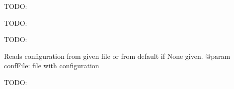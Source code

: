 \documentclass[a4paper,11pt,openany]{sphinxmanual}
\begin{document}
\begin{fulllineitems}
\begin{fulllineitems}
\end{fulllineitems}


\begin{fulllineitems}
\label{ref-manual/XrdTestSlave:XrdTestSlave.XrdTestSlave.handleTestSuiteFinalize}
TODO:

\end{fulllineitems}


\begin{fulllineitems}
\label{ref-manual/XrdTestSlave:XrdTestSlave.XrdTestSlave.handleTestSuiteInitialize}
TODO:

\end{fulllineitems}


\begin{fulllineitems}
\label{ref-manual/XrdTestSlave:XrdTestSlave.XrdTestSlave.parseTags}
TODO:

\end{fulllineitems}


\begin{fulllineitems}
\label{ref-manual/XrdTestSlave:XrdTestSlave.XrdTestSlave.readConfig}
Reads configuration from given file or from default if None given.
@param confFile: file with configuration

\end{fulllineitems}


\begin{fulllineitems}
\label{ref-manual/XrdTestSlave:XrdTestSlave.XrdTestSlave.recvLoop}
TODO:

\end{fulllineitems}



\end{fulllineitems}
\end{document}
